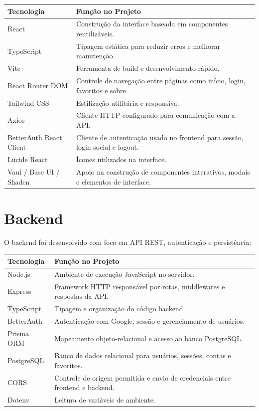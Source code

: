 \documentclass[
    12pt,
    oneside,
    openright,
    a4paper,
    english,
    brazil
]{abntex2}
\begin{document}
\begin{longtable}{|p{4cm}|p{10cm}|}
\hline
\textbf{Tecnologia} & \textbf{Função no Projeto} \\
\hline
React & Construção da interface baseada em componentes reutilizáveis. \\
\hline
TypeScript & Tipagem estática para reduzir erros e melhorar manutenção. \\
\hline
Vite & Ferramenta de build e desenvolvimento rápido. \\
\hline
React Router DOM & Controle de navegação entre páginas como início, login, favoritos e sobre. \\
\hline
Tailwind CSS & Estilização utilitária e responsiva. \\
\hline
Axios & Cliente HTTP configurado para comunicação com a API. \\
\hline
BetterAuth React Client & Cliente de autenticação usado no frontend para sessão, login social e logout. \\
\hline
Lucide React & Ícones utilizados na interface. \\
\hline
Vaul / Base UI / Shadcn & Apoio na construção de componentes interativos, modais e elementos de interface. \\
\hline
\end{longtable}

\section{Backend}

O backend foi desenvolvido com foco em API REST, autenticação e persistência:

\begin{longtable}{|p{4cm}|p{10cm}|}
\hline
\textbf{Tecnologia} & \textbf{Função no Projeto} \\
\hline
Node.js & Ambiente de execução JavaScript no servidor. \\
\hline
Express & Framework HTTP responsável por rotas, middlewares e respostas da API. \\
\hline
TypeScript & Tipagem e organização do código backend. \\
\hline
BetterAuth & Autenticação com Google, sessão e gerenciamento de usuários. \\
\hline
Prisma ORM & Mapeamento objeto-relacional e acesso ao banco PostgreSQL. \\
\hline
PostgreSQL & Banco de dados relacional para usuários, sessões, contas e favoritos. \\
\hline
CORS & Controle de origem permitida e envio de credenciais entre frontend e backend. \\
\hline
Dotenv & Leitura de variáveis de ambiente. \\
\hline
\end{longtable}
\end{document}
